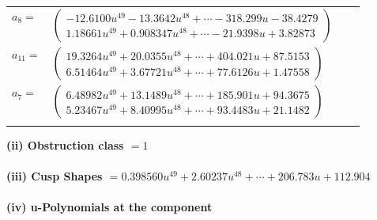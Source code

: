 \documentclass[1p]{elsarticle_modified}
\theoremstyle{definition}
\begin{document}
\begin{tabular}{m{7pt} m{180pt} m{7pt} m{180pt} }
\flushright $a_{8}=$&$\begin{pmatrix}-12.6100 u^{49}-13.3642 u^{48}+\cdots-318.299 u-38.4279\\1.18661 u^{49}+0.908347 u^{48}+\cdots-21.9398 u+3.82873\end{pmatrix}$ \\
\flushright $a_{11}=$&$\begin{pmatrix}19.3264 u^{49}+20.0355 u^{48}+\cdots+404.021 u+87.5153\\6.51464 u^{49}+3.67721 u^{48}+\cdots+77.6126 u+1.47558\end{pmatrix}$ \\
\flushright $a_{7}=$&$\begin{pmatrix}6.48982 u^{49}+13.1489 u^{48}+\cdots+185.901 u+94.3675\\5.23467 u^{49}+8.40995 u^{48}+\cdots+93.4483 u+21.1482\end{pmatrix}$\\&\end{tabular}
\flushleft \textbf{(ii) Obstruction class $= 1$}\\~\\
\flushleft \textbf{(iii) Cusp Shapes $= 0.398560 u^{49}+2.60237 u^{48}+\cdots+206.783 u+112.904$}\\~\\
\newpage\renewcommand{\arraystretch}{1}
\flushleft \textbf{(iv) u-Polynomials at the component}\newline \\
\end{document}
